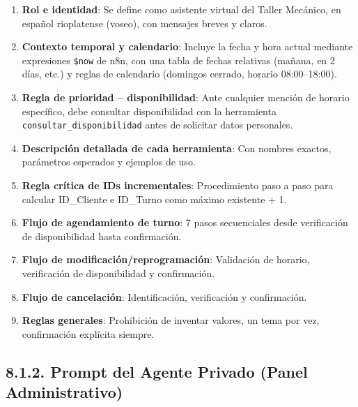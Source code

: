 \documentclass[12pt,a4paper]{report}
\begin{document}
\begin{enumerate}
  \item \textbf{Rol e identidad}: Se define como asistente virtual del Taller Mecánico, en español rioplatense (voseo), con mensajes breves y claros.
  \item \textbf{Contexto temporal y calendario}: Incluye la fecha y hora actual mediante expresiones \texttt{\$now} de n8n, con una tabla de fechas relativas (mañana, en 2 días, etc.) y reglas de calendario (domingos cerrado, horario 08:00--18:00).
  \item \textbf{Regla de prioridad -- disponibilidad}: Ante cualquier mención de horario específico, debe consultar disponibilidad con la herramienta \texttt{consultar\_disponibilidad} antes de solicitar datos personales.
  \item \textbf{Descripción detallada de cada herramienta}: Con nombres exactos, parámetros esperados y ejemplos de uso.
  \item \textbf{Regla crítica de IDs incrementales}: Procedimiento paso a paso para calcular ID\_Cliente e ID\_Turno como máximo existente + 1.
  \item \textbf{Flujo de agendamiento de turno}: 7 pasos secuenciales desde verificación de disponibilidad hasta confirmación.
  \item \textbf{Flujo de modificación/reprogramación}: Validación de horario, verificación de disponibilidad y confirmación.
  \item \textbf{Flujo de cancelación}: Identificación, verificación y confirmación.
  \item \textbf{Reglas generales}: Prohibición de inventar valores, un tema por vez, confirmación explícita siempre.
\end{enumerate}

\subsection*{8.1.2. Prompt del Agente Privado (Panel Administrativo)}
\end{document}
